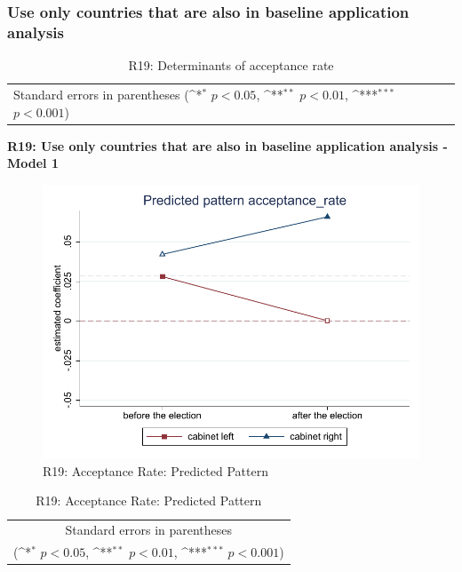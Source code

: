 \documentclass[10pt,a4paper]{scrartcl}
\begin{document}


\clearpage
\FloatBarrier
\subsubsection{Use only countries that are also in baseline application analysis}
\begin{table}[!ht]\centering
	\renewcommand{\arraystretch}{1.25}
	\small
	\def\sym#1{\ifmmode^{#1}\else\(^{#1}\)\fi}
	\caption{R19: Determinants of acceptance rate}
	\begin{tabular}{l*{3}{c}}
		\hline\hline
		
		\hline\hline
		\multicolumn{4}{l}{\footnotesize Standard errors in parentheses (\sym{*} \(p<0.05\), \sym{**} \(p<0.01\), \sym{***} \(p<0.001\))}\\
	\end{tabular}
\end{table}

\clearpage
\textbf{R19: Use only countries that are also in baseline application analysis - Model 1}
\begin{figure}[!ht]
	\centering
	\includegraphics[width=1\textwidth]{figures_edited/acceptance_rate_graph1_R19.pdf}
	\caption{R19: Acceptance Rate: Predicted Pattern}
\end{figure}

\begin{table}[!ht]\centering
	\renewcommand{\arraystretch}{1.25}
	\def\sym#1{\ifmmode^{#1}\else\(^{#1}\)\fi}
	\caption{R19: Acceptance Rate: Predicted Pattern}
	\begin{tabular}{l*{2}{c}}
		\hline\hline
		
		\hline\hline
		\multicolumn{3}{c}{\footnotesize Standard errors in parentheses} \\
		\multicolumn{3}{c}{\footnotesize (\sym{*} \(p<0.05\), \sym{**} \(p<0.01\), \sym{***} \(p<0.001\))}\\
	\end{tabular}
\end{table}
\end{document}
